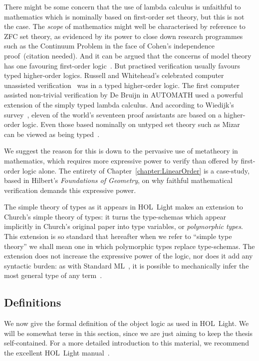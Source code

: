 There might be some concern that the use of lambda calculus is unfaithful to mathematics which is nominally based on first-order set theory, but this is not the case. The \emph{scope} of mathematics might well be characterised by reference to ZFC set theory, as evidenced by its power to close down research programmes such as the Continuum Problem in the face of Cohen's independence proof~(citation needed). And it can be argued that the concerns of model theory has one favouring first-order logic~\cite{LogicFirstOrder}. But practised verification usually favours typed higher-order logics. Russell and Whitehead's celebrated computer unassisted verification~\cite{Principia} was in a typed higher-order logic. The first computer assisted non-trivial verification by De Bruijn in AUTOMATH used a powerful extension of the simply typed lambda calculus. And according to Wiedijk's survey~\cite{SeventeenProvers}, eleven of the world's seventeen proof assistants are based on a higher-order logic. Even those based nominally on untyped set theory such as Mizar~\cite{MizarMathematicalVernacular} can be viewed as being typed~\cite{MizarSoftTypes}. 

We suggest the reason for this is down to the pervasive use of metatheory in mathematics, which requires more expressive power to verify than offered by first-order logic alone. The entirety of Chapter~\ref{chapter:LinearOrder} is a case-study, based in Hilbert's \emph{Foundations of Geometry}, on why faithful mathematical verification demands this expressive power.

The simple theory of types as it appears in HOL~Light makes an extension to Church's simple theory of types: it turns the type-schemas which appear implicitly in Church's original paper into type variables, or \emph{polymorphic types}. This extension is so standard that hereafter when we refer to ``simple type theory'' we shall mean one in which polymorphic types replace type-schemas. The extension does not increase the expressive power of the logic, nor does it add any syntactic burden: as with Standard ML~\cite{StandardML}, it is possible to mechanically infer the most general type of any term~\cite{HindleyMilner}.

\subsection{Definitions}\label{sec:ObjectLogicFormal}
We now give the formal definition of the object logic as used in HOL~Light. We will be somewhat terse in this section, since we are just aiming to keep the thesis self-contained. For a more detailed introduction to this material, we recommend the excellent HOL~Light manual~\cite{HOLLightManual}.

